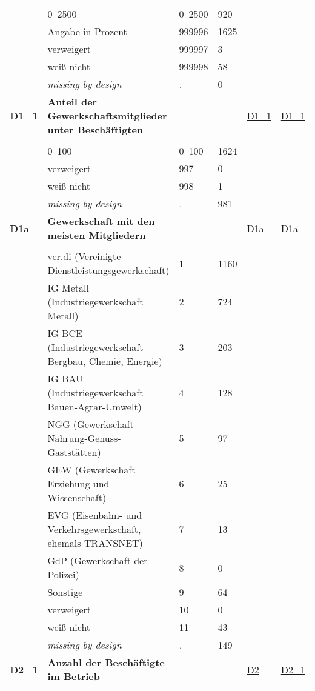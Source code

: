 \begin{longtable}{| L{2.45cm} | L{6cm} | C{1.5cm} | R{1cm} | C{2.25cm} | C{2.25cm} |}
   & 0--2500 & 0--2500 & 920 &  &  \\ 
   & Angabe in Prozent & 999996 & 1625 &  &  \\ 
   & verweigert & 999997 & 3 &  &  \\ 
   & weiß nicht & 999998 & 58 &  &  \\ 
   & \textit{missing by design} & \textit{.} & 0 &  &  \\ 
   \midrule
\textbf{D1\_1}\label{var:D1:1} & \textbf{Anteil der Gewerkschaftsmitglieder unter Beschäftigten} &  &  & \hyperref[D1:1]{D1\_1} & \hyperref[var:suf:D1:1]{D1\_1} \\ 
   &  &  &  &  &  \\ 
   & 0--100 & 0--100 & 1624 &  &  \\ 
   & verweigert & 997 & 0 &  &  \\ 
   & weiß nicht & 998 & 1 &  &  \\ 
   & \textit{missing by design} & \textit{.} & 981 &  &  \\ 
   \midrule
\textbf{D1a}\label{var:D1a} & \textbf{Gewerkschaft mit den meisten Mitgliedern} &  &  & \hyperref[D1a]{D1a} & \hyperref[var:suf:D1a]{D1a} \\ 
   &  &  &  &  &  \\ 
   & ver.di (Vereinigte Dienstleistungsgewerkschaft) & 1 & 1160 &  &  \\ 
   & IG Metall (Industriegewerkschaft Metall) & 2 & 724 &  &  \\ 
   & IG BCE (Industriegewerkschaft Bergbau, Chemie, Energie) & 3 & 203 &  &  \\ 
   & IG BAU (Industriegewerkschaft Bauen-Agrar-Umwelt) & 4 & 128 &  &  \\ 
   & NGG (Gewerkschaft Nahrung-Genuss-Gaststätten) & 5 & 97 &  &  \\ 
   & GEW (Gewerkschaft Erziehung und Wissenschaft) & 6 & 25 &  &  \\ 
   & EVG (Eisenbahn- und Verkehrsgewerkschaft, ehemals TRANSNET) & 7 & 13 &  &  \\ 
   & GdP (Gewerkschaft der Polizei) & 8 & 0 &  &  \\ 
   & Sonstige & 9 & 64 &  &  \\ 
   & verweigert & 10 & 0 &  &  \\ 
   & weiß nicht & 11 & 43 &  &  \\ 
   & \textit{missing by design} & \textit{.} & 149 &  &  \\ 
   \midrule
\textbf{D2\_1}\label{var:D2:1} & \textbf{Anzahl der Beschäftigte im Betrieb} &  &  & \hyperref[D2]{D2} & \hyperref[var:suf:D2:1]{D2\_1} \\ 

\end{longtable}
